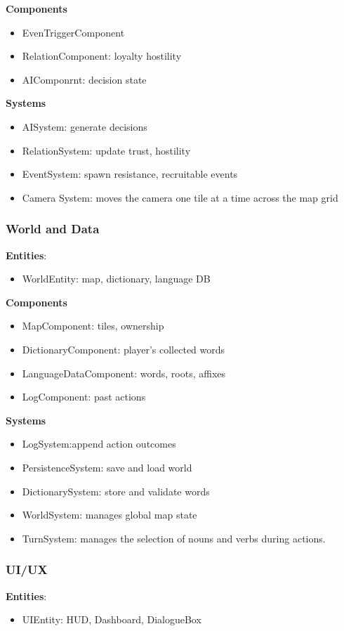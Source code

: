 \documentclass[11pt]{article}
\begin{document}
\textbf{Components}
\begin{itemize}
\item
  EvenTriggerComponent
\item
  RelationComponent: loyalty hostility
\item
  AIComponrnt: decision state
\end{itemize}

\textbf{Systems}
\begin{itemize}
\item
  AISystem: generate decisions
\item
  RelationSystem: update trust, hostility
\item
  EventSystem: spawn resistance, recruitable events
\item
  Camera System: moves the camera one tile at a time across the map grid
\end{itemize}

\subsubsection{World and Data}
\textbf{Entities}:
\begin{itemize}
\item
  WorldEntity: map, dictionary, language DB
\end{itemize}

\textbf{Components}
\begin{itemize}
\item
  MapComponent: tiles, ownership
\item
  DictionaryComponent: player's collected words
\item
  LanguageDataComponent: words, roots, affixes
\item
  LogComponent: past actions
\end{itemize}

\textbf{Systems}
\begin{itemize}
\item
  LogSystem:append action outcomes
\item
  PersistenceSystem: save and load world
\item
  DictionarySystem: store and validate words
\item
  WorldSystem: manages global map state
\item
  TurnSystem: manages the selection of nouns and verbs during actions.
\end{itemize}

\subsubsection{UI/UX}
\textbf{Entities}:
\begin{itemize}
\item
  UIEntity: HUD, Dashboard, DialogueBox
\end{itemize}
\end{document}
